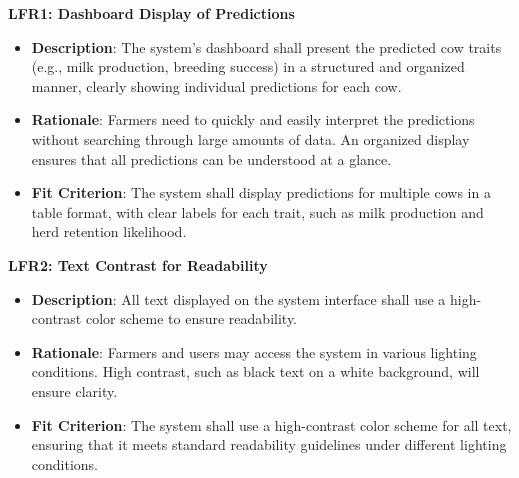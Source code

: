 \documentclass[12pt]{article}
\begin{document}
\textbf{LFR1: Dashboard Display of Predictions}
\begin{itemize}
    \item \textbf{Description}: The system's dashboard shall present the 
    predicted cow traits (e.g., milk production, breeding success) in a 
    structured and organized manner, clearly showing individual predictions 
    for each cow.
    \item \textbf{Rationale}: Farmers need to quickly and easily interpret the 
    predictions without searching through large amounts of data. An organized 
    display ensures that all predictions can be understood at a glance.
    \item \textbf{Fit Criterion}: The system shall display predictions for 
    multiple cows in a table format, with clear labels for each trait, such 
    as milk production and herd retention likelihood.
\end{itemize}
\textbf{LFR2: Text Contrast for Readability}
\begin{itemize}
    \item \textbf{Description}: All text displayed on the system interface 
    shall use a high-contrast color scheme to ensure readability.
    \item \textbf{Rationale}: Farmers and users may access the system in 
    various lighting conditions. High contrast, such as black text on a 
    white background, will ensure clarity.
    \item \textbf{Fit Criterion}: The system shall use a high-contrast 
    color scheme for all text, ensuring that it meets standard readability 
    guidelines under different lighting conditions.
\end{itemize}
\end{document}
